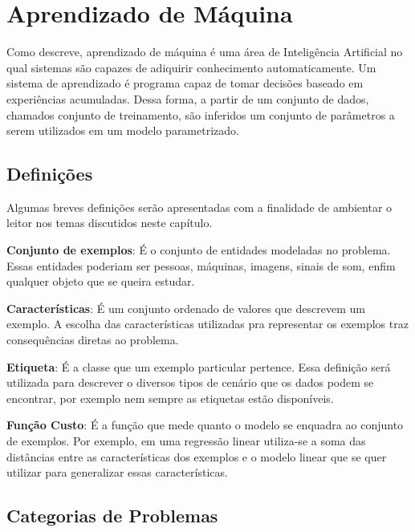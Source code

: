 \chapter{Aprendizado de Máquina}
Como \citet{rezende2003sistemas} descreve, aprendizado de máquina é uma área de Inteligência Artificial no qual sistemas são capazes de adiquirir conhecimento automaticamente. Um sistema de aprendizado é programa capaz de tomar decisões baseado em experiências acumuladas. Dessa forma, a partir de um conjunto de dados, chamados conjunto de treinamento, são inferidos um conjunto de parâmetros a serem utilizados em um modelo parametrizado.

\section{Definições}

Algumas breves definições serão apresentadas com a finalidade de ambientar o leitor nos temas discutidos neste capítulo.

\begin{description}
\item \textbf{Conjunto de exemplos}: É o conjunto de entidades modeladas no problema. Essas entidades poderiam ser pessoas, máquinas, imagens, sinais de som, enfim qualquer objeto que se queira estudar.

\item \textbf{Características}: É um conjunto ordenado de valores que descrevem um exemplo. A escolha das características utilizadas pra representar os exemplos traz consequências diretas ao problema.

\item \textbf{Etiqueta}: É a classe que um exemplo particular pertence. Essa definição será utilizada para descrever o diversos tipos de cenário que os dados podem se encontrar, por exemplo nem sempre as etiquetas estão disponíveis.

\item \textbf{Função Custo}: É a função que mede quanto o modelo se enquadra ao conjunto de exemplos. Por exemplo, em uma regressão linear utiliza-se a soma das distâncias entre as características dos exemplos e o modelo linear que se quer utilizar para generalizar essas características.
\end{description}


\section{Categorias de Problemas}


